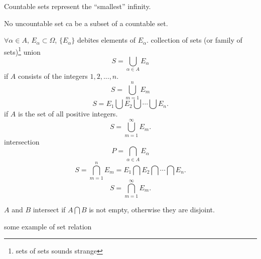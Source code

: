 Countable sets represent the ``smallest'' infinity.

No uncountable set ca be a subset of a countable set.


\begin{myDefinition}\label{myDefinition:2.9union_intersection}
    $\forall \alpha\in A$, $E_\alpha \subset \Omega$, $\{E_\alpha\}$ debites elements of $E_\alpha$. collection of sets (or family of sets)\footnote{sets of sets sounds strange}    
    union
    \begin{equation}\label{eq:2.1 union}
        S = \bigcup_{\alpha\in A} E_\alpha
    \end{equation}
    if $A$ consists of the integers $1,2,...,n$.
    \begin{equation}\label{eq:2.2 union finite}
        S = \bigcup_{m=1}^n E_m
    \end{equation}
    \begin{equation}\label{eq:2.3 union finite2}
        S = E_1 \bigcup E_2 \bigcup \cdots \bigcup E_n.
    \end{equation}
    if $A$ is the set of all positive integers.
    \begin{equation}\label{eq:2.4 union countable}
        S = \bigcup_{m=1}^{\infty} E_m.
    \end{equation}
    intersection
    \begin{equation}\label{eq:2.5 intersection}
        P = \bigcap_{\alpha\in A} E_\alpha
    \end{equation}
    \begin{equation}\label{eq:2.6 intersection finite}
        S = \bigcap_{m=1}^n E_m = E_1 \bigcap E_2 \bigcap \cdots \bigcap E_n.
    \end{equation}
    \begin{equation}\label{eq:2.7 intersection countable}
        S = \bigcap_{m=1}^{\infty} E_m.
    \end{equation}

    $A$ and $B$ intersect if $A\bigcap B$ is not empty, otherwise they are disjoint.
\end{myDefinition}

\begin{myExample}
    some example of set relation
\end{myExample}

